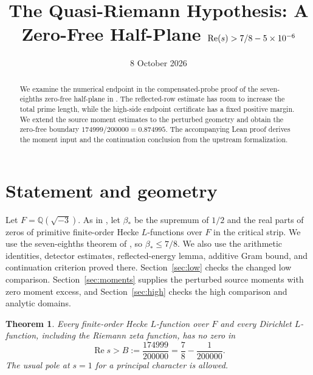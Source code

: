 \documentclass[11pt]{article}
\title{The Quasi-Riemann Hypothesis: A Zero-Free Half-Plane
$\Ree(s)>7/8-5\times10^{-6}$}
\author{}
\date{8 October 2026}
\newtheorem{theorem}{Theorem}
\newcommand{\Ree}{\operatorname{Re}}
\begin{document}
\maketitle

\begin{abstract}
We examine the numerical endpoint in the compensated-probe proof of the
seven-eighths zero-free half-plane in \cite{OAI}. The reflected-row estimate
has room to increase the total prime length, while the high-side endpoint
certificate has a fixed positive margin. We extend the source moment
estimates to the perturbed geometry and obtain the zero-free boundary
$174999/200000=0.874995$. The accompanying Lean proof derives the moment
input and the continuation conclusion from the upstream formalization.
\end{abstract}

\section{Statement and geometry}

Let $F=\mathbb Q(\sqrt{-3})$. As in \cite[Equation (1.1b)]{OAI}, let
$\beta_*$ be the supremum of $1/2$ and the real parts of zeros of primitive
finite-order Hecke $L$-functions over $F$ in the critical strip. We use the
seven-eighths theorem of \cite{OAI}, so $\beta_*\le 7/8$. We also use the
arithmetic identities, detector estimates, reflected-energy lemma, additive
Gram bound, and continuation criterion proved there.
Section~\ref{sec:low} checks the changed low comparison.
Section~\ref{sec:moments} supplies the perturbed source moments with
zero moment excess, and Section~\ref{sec:high} checks the high comparison
and analytic domains.

\begin{theorem}\label{thm:main}
Every finite-order Hecke $L$-function over $F$ and every Dirichlet
$L$-function, including the Riemann zeta function, has no zero in
\[
    \Ree s> B:=\frac{174999}{200000}
                =\frac78-\frac1{200000}.
\]
The usual pole at $s=1$ for a principal character is allowed.
\end{theorem}
\end{document}
